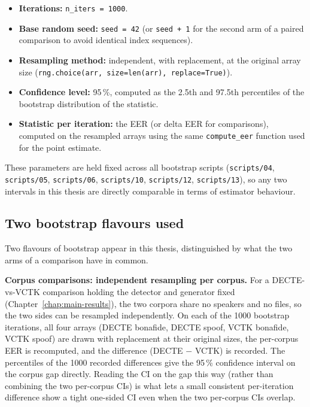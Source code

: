 \begin{itemize}
    \item \textbf{Iterations:} \texttt{n\_iters = 1000}.
    \item \textbf{Base random seed:} \texttt{seed = 42} (or \texttt{seed + 1} for the second
        arm of a paired comparison to avoid identical index sequences).
    \item \textbf{Resampling method:} independent, with replacement, at the
        original array size (\texttt{rng.choice(arr, size=len(arr), replace=True)}).
    \item \textbf{Confidence level:} 95\,\%, computed as the 2.5th and 97.5th
        percentiles of the bootstrap distribution of the statistic.
    \item \textbf{Statistic per iteration:} the EER (or delta EER for
        comparisons), computed on the resampled arrays using the same
        \texttt{compute\_eer} function used for the point estimate.
\end{itemize}

These parameters are held fixed across all bootstrap scripts
(\texttt{scripts/04}, \texttt{scripts/05}, \texttt{scripts/06},
\texttt{scripts/10}, \texttt{scripts/12}, \texttt{scripts/13}), so
any two intervals in this thesis are directly comparable in terms
of estimator behaviour.

\subsection{Two bootstrap flavours used}
\label{sec:methodology-bootstrap-flavours}

Two flavours of bootstrap appear in this thesis, distinguished by
what the two arms of a comparison have in common.

\textbf{Corpus comparisons: independent resampling per corpus.} For
a DECTE-vs-VCTK comparison holding the detector and generator fixed
(Chapter~\ref{chap:main-results}), the two corpora share no speakers
and no files, so the two sides can be resampled independently. On
each of the 1000 bootstrap iterations, all four arrays (DECTE
bonafide, DECTE spoof, VCTK bonafide, VCTK spoof) are drawn with
replacement at their original sizes, the per-corpus EER is
recomputed, and the difference (DECTE $-$ VCTK) is recorded. The
percentiles of the 1000 recorded differences give the 95\,\%
confidence interval on the corpus gap directly. Reading the CI on
the gap this way (rather than combining the two per-corpus CIs) is
what lets a small consistent per-iteration difference show a tight
one-sided CI even when the two per-corpus CIs overlap.

